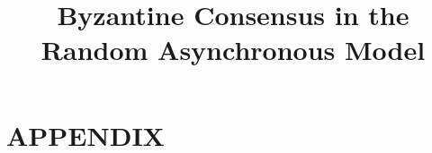 \documentclass[acmsmall,nonacm]{acmart}
\newif\ifpublish
\begin{document}
\title[]{Byzantine Consensus in the Random Asynchronous Model}

\ifpublish
  \author{George Danezis}
  \affiliation{
    \institution{Mysten Labs and University College London}
    \country{United Kingdom}
  }  
  \author{Jovan Komatovic}
  \affiliation{
    \institution{EPFL}
    \country{Switzerland}
  }
  \author{Lefteris Kokoris-Kogias}
  \affiliation{
    \institution{Mysten Labs}
    \country{Greece}
  }
  \author{Alberto Sonnino}
  \affiliation{
    \institution{Mysten Labs and University College London}
    \country{United Kingdom}
  }
  \author{Igor Zablotchi}
  \affiliation{
    \institution{Mysten Labs}
    \country{Switzerland}
  }
\else
  \author{}
  \affiliation{}

  \renewcommand\footnotetextcopyrightpermission[1]{}
\fi

\renewcommand{\shortauthors}{}
\begin{abstract}
  
\end{abstract}

\maketitle
\clearpage\newpage
\setcounter{page}{1}





%     



\clearpage\newpage
\appendix
\section*{APPENDIX}






\end{document}
